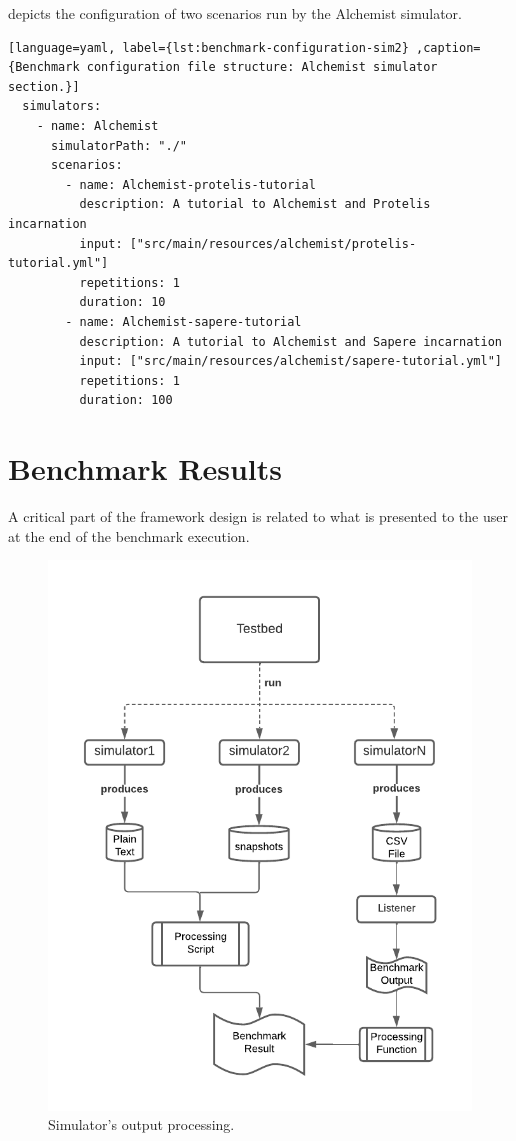 \documentclass[12pt,a4paper,openright,twoside]{book}
\begin{document}
 depicts the configuration of two scenarios run by the Alchemist simulator.

\begin{lstlisting}[language=yaml, label={lst:benchmark-configuration-sim2} ,caption={Benchmark configuration file structure: Alchemist simulator section.}]
  simulators:
    - name: Alchemist
      simulatorPath: "./"
      scenarios:
        - name: Alchemist-protelis-tutorial
          description: A tutorial to Alchemist and Protelis incarnation
          input: ["src/main/resources/alchemist/protelis-tutorial.yml"]
          repetitions: 1
          duration: 10
        - name: Alchemist-sapere-tutorial
          description: A tutorial to Alchemist and Sapere incarnation
          input: ["src/main/resources/alchemist/sapere-tutorial.yml"]
          repetitions: 1
          duration: 100
  \end{lstlisting}

\section{Benchmark Results}

A critical part of the framework design is related to what is presented to the user at the end of the benchmark execution.

\begin{figure}[h!]
  \centering
  \includegraphics[width=\textwidth]{figures/output-processing.pdf}
  \caption{Simulator's output processing.}
  \label{fig:output}
\end{figure}
\end{document}
